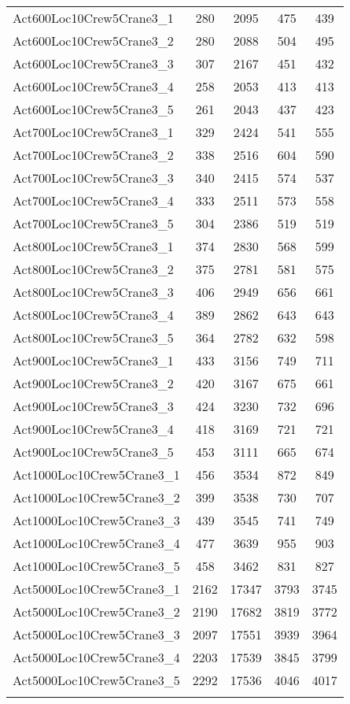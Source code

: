 \begin{center}
\begin{longtable}{ | l | c | c | c | c | }
Act600Loc10Crew5Crane3\_1	&	280	&	2095	&	475	&	439	\\
Act600Loc10Crew5Crane3\_2	&	280	&	2088	&	504	&	495	\\
Act600Loc10Crew5Crane3\_3	&	307	&	2167	&	451	&	432	\\
Act600Loc10Crew5Crane3\_4	&	258	&	2053	&	413	&	413	\\
Act600Loc10Crew5Crane3\_5	&	261	&	2043	&	437	&	423	\\
Act700Loc10Crew5Crane3\_1	&	329	&	2424	&	541	&	555	\\
Act700Loc10Crew5Crane3\_2	&	338	&	2516	&	604	&	590	\\
Act700Loc10Crew5Crane3\_3	&	340	&	2415	&	574	&	537	\\
Act700Loc10Crew5Crane3\_4	&	333	&	2511	&	573	&	558	\\
Act700Loc10Crew5Crane3\_5	&	304	&	2386	&	519	&	519	\\
Act800Loc10Crew5Crane3\_1	&	374	&	2830	&	568	&	599	\\
Act800Loc10Crew5Crane3\_2	&	375	&	2781	&	581	&	575	\\
Act800Loc10Crew5Crane3\_3	&	406	&	2949	&	656	&	661	\\
Act800Loc10Crew5Crane3\_4	&	389	&	2862	&	643	&	643	\\
Act800Loc10Crew5Crane3\_5	&	364	&	2782	&	632	&	598	\\
Act900Loc10Crew5Crane3\_1	&	433	&	3156	&	749	&	711	\\
Act900Loc10Crew5Crane3\_2	&	420	&	3167	&	675	&	661	\\
Act900Loc10Crew5Crane3\_3	&	424	&	3230	&	732	&	696	\\
Act900Loc10Crew5Crane3\_4	&	418	&	3169	&	721	&	721	\\
Act900Loc10Crew5Crane3\_5	&	453	&	3111	&	665	&	674	\\
Act1000Loc10Crew5Crane3\_1	&	456	&	3534	&	872	&	849	\\
Act1000Loc10Crew5Crane3\_2	&	399	&	3538	&	730	&	707	\\
Act1000Loc10Crew5Crane3\_3	&	439	&	3545	&	741	&	749	\\
Act1000Loc10Crew5Crane3\_4	&	477	&	3639	&	955	&	903	\\
Act1000Loc10Crew5Crane3\_5	&	458	&	3462	&	831	&	827	\\
Act5000Loc10Crew5Crane3\_1	&	2162	&	17347	&	3793	&	3745	\\
Act5000Loc10Crew5Crane3\_2	&	2190	&	17682	&	3819	&	3772	\\
Act5000Loc10Crew5Crane3\_3	&	2097	&	17551	&	3939	&	3964	\\
Act5000Loc10Crew5Crane3\_4	&	2203	&	17539	&	3845	&	3799	\\
Act5000Loc10Crew5Crane3\_5	&	2292	&	17536	&	4046	&	4017	\\
\hline																			
\label{tab:solutionAssignAltRFSTF100s}					
\end{longtable}									
\end{center}

